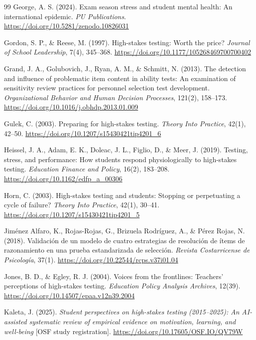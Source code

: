 \documentclass[11pt]{article}
\begin{document}
\begin{thebibliography}{99}
George, A. S. (2024). Exam season stress and student mental health: An international epidemic. \textit{PU Publications}. \url{https://doi.org/10.5281/zenodo.10826031}

Gordon, S. P., \& Reese, M. (1997). High-stakes testing: Worth the price? \textit{Journal of School Leadership}, 7(4), 345--368. \url{https://doi.org/10.1177/105268469700700402}

Grand, J. A., Golubovich, J., Ryan, A. M., \& Schmitt, N. (2013). The detection and influence of problematic item content in ability tests: An examination of sensitivity review practices for personnel selection test development. \textit{Organizational Behavior and Human Decision Processes}, 121(2), 158--173. \url{https://doi.org/10.1016/j.obhdp.2013.01.009}

Gulek, C. (2003). Preparing for high-stakes testing. \textit{Theory Into Practice}, 42(1), 42--50. \url{https://doi.org/10.1207/s15430421tip4201_6}

Heissel, J. A., Adam, E. K., Doleac, J. L., Figlio, D., \& Meer, J. (2019). Testing, stress, and performance: How students respond physiologically to high-stakes testing. \textit{Education Finance and Policy}, 16(2), 183--208. \url{https://doi.org/10.1162/edfp_a_00306}

Horn, C. (2003). High-stakes testing and students: Stopping or perpetuating a cycle of failure? \textit{Theory Into Practice}, 42(1), 30--41. \url{https://doi.org/10.1207/s15430421tip4201_5}

Jim\'enez Alfaro, K., Rojas-Rojas, G., Brizuela Rodr\'iguez, A., \& P\'erez Rojas, N. (2018). Validaci\'on de un modelo de cuatro estrategias de resoluci\'on de \'items de razonamiento en una prueba estandarizada de selecci\'on. \textit{Revista Costarricense de Psicolog\'ia}, 37(1). \url{https://doi.org/10.22544/rcps.v37i01.04}

Jones, B. D., \& Egley, R. J. (2004). Voices from the frontlines: Teachers' perceptions of high-stakes testing. \textit{Education Policy Analysis Archives}, 12(39). \url{https://doi.org/10.14507/epaa.v12n39.2004}

Kaleta, J. (2025). \textit{Student perspectives on high-stakes testing (2015--2025): An AI-assisted systematic review of empirical evidence on motivation, learning, and well-being} [OSF study registration]. \url{https://doi.org/10.17605/OSF.IO/QV79W}


\end{thebibliography}
\end{document}
